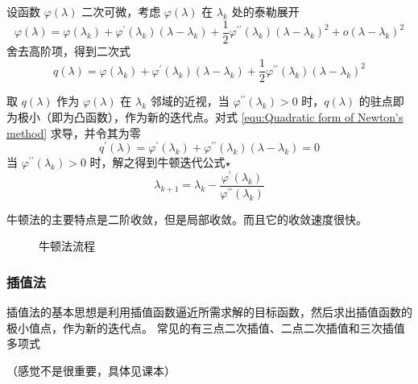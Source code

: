 \documentclass{book}
\begin{document}
设函数 $\varphi(\lambda)$ 二次可微，考虑 $\varphi(\lambda)$ 在 $\lambda_k$ 处的泰勒展开
$$
    \varphi(\lambda)=\varphi(\lambda_k)+\varphi^{\prime}(\lambda_k)(\lambda-\lambda_k)+\frac{1}{2}\varphi^{\prime\prime}(\lambda_k)(\lambda-\lambda_k)^2+o(\lambda-\lambda_k)^2
$$
舍去高阶项，得到二次式
\begin{equation}
    q(\lambda)=\varphi(\lambda_k)+\varphi^{\prime}(\lambda_k)(\lambda-\lambda_k)+\frac{1}{2}\varphi^{\prime\prime}(\lambda_k)(\lambda-\lambda_k)^2
    \label{equ:Quadratic form of Newton's method}
\end{equation}

取 $q(\lambda)$ 作为 $\varphi(\lambda)$ 在 $\lambda_k$ 邻域的近视，当 $\varphi^{\prime\prime}(\lambda_k)>0$ 时，$q(\lambda)$ 的驻点即为极小（即为凸函数），作为新的迭代点。对式 \ref{equ:Quadratic form of Newton's method} 求导，并令其为零
$$
    q^{\prime}(\lambda)=\varphi^{\prime}(\lambda_k)+\varphi^{\prime\prime}(\lambda_k)(\lambda-\lambda_k)=0
$$
当 $\varphi^{\prime\prime}(\lambda_k)>0$ 时，解之得到牛顿迭代公式$\star$
\begin{equation}
    \lambda_{k+1}=\lambda_k-\frac{\varphi^{\prime}(\lambda_k)}{\varphi^{\prime\prime}(\lambda_k)}
    \label{equ:Newton's method}
\end{equation}

牛顿法的主要特点是二阶收敛，但是局部收敛。而且它的收敛速度很快。

\begin{figure}
    \centering
    
    \caption{牛顿法流程}
    \label{fig:flow of Newton's method}
\end{figure}

\subsubsection{插值法}

插值法的基本思想是利用插值函数逼近所需求解的目标函数，然后求出插值函数的极小值点，作为新的迭代点。
常见的有三点二次插值、二点二次插值和三次插值多项式

（感觉不是很重要，具体见课本）
\end{document}
